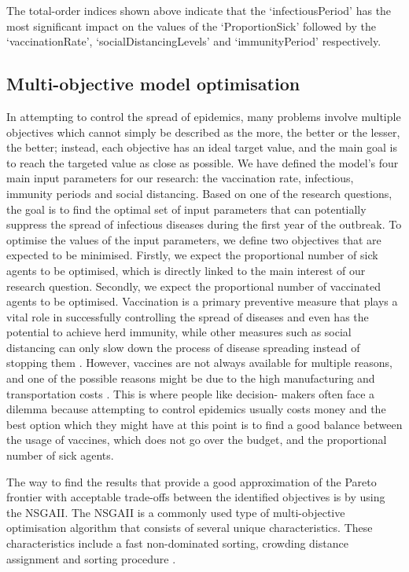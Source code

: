 \documentclass[smallextended]{svjour3}       %
\begin{document}
The total-order indices shown above indicate that the ‘infectiousPeriod’ has the most significant impact on the values of the ‘ProportionSick’ followed by the ‘vaccinationRate’, ‘socialDistancingLevels’ and ‘immunityPeriod’ respectively.




\subsection{Multi-objective model optimisation}

In attempting to control the spread of epidemics, many problems involve multiple objectives which cannot simply be described as the more, the better or the lesser, the better; instead, each objective has an ideal target value, and the main goal is to reach the targeted value as close as possible. We have defined the model's four main input parameters for our research: the vaccination rate, infectious, immunity periods and social distancing. Based on one of the research questions, the goal is to find the optimal set of input parameters that can potentially suppress the spread of infectious diseases during the first year of the outbreak. To optimise the values of the input parameters, we define two objectives that are expected to be minimised. Firstly, we expect the proportional number of sick agents to be optimised, which is directly linked to the main interest of our research question. Secondly, we expect the proportional number of vaccinated agents to be optimised. Vaccination is a primary preventive measure that plays a vital role in successfully controlling the spread of diseases and even has the potential to achieve herd immunity, while other measures such as social distancing can only slow down the process of disease spreading instead of stopping them \cite{bicher2022model}. However, vaccines are not always available for multiple reasons, and one of the possible reasons might be due to the high manufacturing and transportation costs \cite{plotkin2017complexity}. This is where people like decision- makers often face a dilemma because attempting to control epidemics usually costs money and the best option which they might have at this point is to find a good balance between the usage of vaccines, which does not go over the budget, and the proportional number of sick agents.

The way to find the results that provide a good approximation of the Pareto frontier with acceptable trade-offs between the identified objectives is by using the NSGAII. The NSGAII is a commonly used type of multi-objective optimisation algorithm that consists of several unique characteristics. These characteristics include a fast non-dominated sorting, crowding distance assignment and sorting procedure \cite{deb2002fast}.
\end{document}
